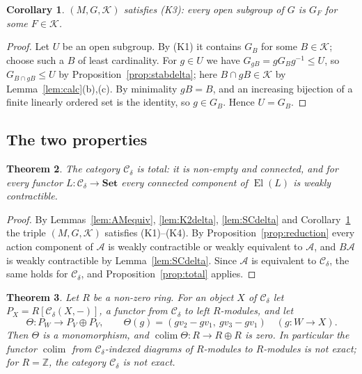 \documentclass[11pt,a4paper]{article}
\newtheorem{theorem}{Theorem}[section]
\newtheorem{corollary}[theorem]{Corollary}
\theoremstyle{definition}
\newcommand{\Cd}{\mathcal{C}_{\delta}}
\newcommand{\El}{\operatorname{El}}
\newcommand{\colim}{\operatorname{colim}}
\newcommand{\Set}{\mathbf{Set}}
\newcommand{\K}{\mathcal{K}}
\newcommand{\Z}{\mathbb{Z}}
\begin{document}
\begin{corollary}\label{cor:opendelta}
$(M,G,\K)$ satisfies \textup{(K3)}: every open subgroup of $G$ is $G_F$ for some
$F\in\K$.
\end{corollary}

\begin{proof}
Let $U$ be an open subgroup. By (K1) it contains $G_B$ for some $B\in\K$;
choose such a $B$ of least cardinality. For $g\in U$ we have
$G_{gB}=gG_Bg^{-1}\le U$, so $G_{B\cap gB}\le U$ by
Proposition~\ref{prop:stabdelta}; here $B\cap gB\in\K$ by
Lemma~\ref{lem:calc}(b),(c). By minimality $gB=B$, and an increasing bijection
of a finite linearly ordered set is the identity, so $g\in G_B$. Hence $U=G_B$.
\end{proof}

\subsection{The two properties}

\begin{theorem}\label{thm:total}
The category $\Cd$ is total: it is non-empty and connected, and for every
functor $L\colon\Cd\to\Set$ every connected component of $\El(L)$ is weakly
contractible.
\end{theorem}

\begin{proof}
By Lemmas~\ref{lem:AMequiv}, \ref{lem:K2delta}, \ref{lem:SCdelta} and
Corollary~\ref{cor:opendelta} the triple $(M,G,\K)$ satisfies (K1)--(K4). By
Proposition~\ref{prop:reduction} every action component of $\mathcal A$ is
weakly contractible or weakly equivalent to $\mathcal A$, and $B\mathcal A$ is
weakly contractible by Lemma~\ref{lem:SCdelta}. Since $\mathcal A$ is equivalent
to $\Cd$, the same holds for $\Cd$, and Proposition~\ref{prop:total} applies.
\end{proof}

\begin{theorem}\label{thm:notexact}
Let $R$ be a non-zero ring. For an object $X$ of $\Cd$ let
$P_X=R[\Cd(X,-)]$, a functor from $\Cd$ to left $R$-modules, and let
\[
 \Theta\colon P_W\longrightarrow P_V\oplus P_V,\qquad
 \Theta(g)=(gv_2-gv_1,\ gv_3-gv_1)\quad(g\colon W\to X).
\]
Then $\Theta$ is a monomorphism, and $\colim\Theta\colon R\to R\oplus R$ is zero.
In particular the functor $\colim$ from $\Cd$-indexed diagrams of $R$-modules to
$R$-modules is not exact; for $R=\Z$, the category $\Cd$ is not exact.
\end{theorem}
\end{document}
